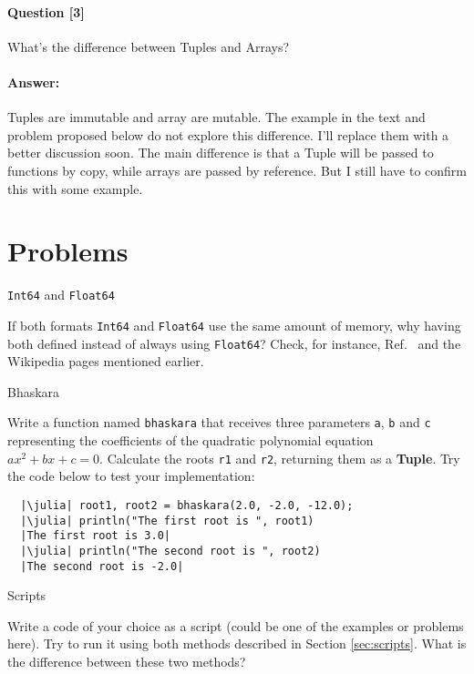 \paragraph*{Question [3]} What's the difference between Tuples and Arrays?

\paragraph*{Answer:} Tuples are immutable and array are mutable. The example in the text and problem proposed below do not explore this difference. I'll replace them with a better discussion soon. The main difference is that a Tuple will be passed to functions by copy, while arrays are passed by reference. But I still have to confirm this with some example.


\section{Problems}

\begin{problem}{\texttt{Int64} and \texttt{Float64}}
 \label{prob:IntFloat}

 If both formats \texttt{Int64} and \texttt{Float64} use the same amount of memory, why having both defined instead of always using \texttt{Float64}? Check, for instance, Ref.~\cite{NFranco2006Calculo} and the Wikipedia pages mentioned earlier.
\end{problem}

\begin{problem}{Bhaskara}
 \label{prob:bhaskara}
 
 Write a function named \texttt{bhaskara} that receives three parameters \texttt{a}, \texttt{b} and \texttt{c} representing the coefficients of the quadratic polynomial equation $a x^2 +bx +c = 0$. Calculate the roots \texttt{r1} and \texttt{r2}, returning them as a \textbf{Tuple}. Try the code below to test your implementation:
 
 \begin{verbatim}
  |\julia| root1, root2 = bhaskara(2.0, -2.0, -12.0);
  |\julia| println("The first root is ", root1)
  |The first root is 3.0|
  |\julia| println("The second root is ", root2)
  |The second root is -2.0|
 \end{verbatim} 
\end{problem}

\begin{problem}{Scripts}
 \label{prob:scripts}
 
 Write a code of your choice as a script (could be one of the examples or problems here). Try to run it using both methods described in Section \ref{sec:scripts}. What is the difference between these two methods? 
\end{problem}


